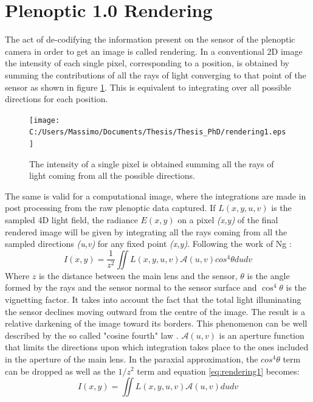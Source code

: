 \section{Plenoptic 1.0 Rendering}
\label{sec:rendering1}
The act of de-codifying the information present on the sensor of the plenoptic camera in order to get an image is called rendering. 
In a conventional 2D image the intensity of each single pixel, corresponding to a position, is obtained by summing the contributions of all the rays of light converging to that point of the sensor \cite{georgiev2010focused} as shown in figure \ref{fig:render1}. This is equivalent to integrating over all possible directions for each position. 
\begin{figure}[H]
	\centering
	\texttt{[image: C:/Users/Massimo/Documents/Thesis/Thesis\_PhD/rendering1.eps]}
	\caption{\label{fig:render1} The intensity of a single pixel is obtained summing all the rays of light coming from all the possible directions.\cite{ng2006digital} }
\end{figure}
The same is valid for a computational image, where the integrations are made in post processing from the raw plenoptic data captured.
 If $L(x,y,u,v)$ is the sampled 4D light field, the radiance $E(x,y)$ on a pixel \textit{(x,y)} of the final rendered image will be given by integrating all the rays coming from all the sampled directions \textit{(u,v)} for any fixed point\textit{ (x,y)}. Following the work of Ng \cite{ng2006digital}:
\begin{equation}
\label{eq:rendering1}
I(x,y)=\dfrac{1}{z^2}\iint L(x,y,u,v)\mathscr{A}(u,v)cos^4\theta dudv
\end{equation} 
Where $z$ is the distance between the main lens and the sensor, $\theta$ is the angle formed by the rays and the sensor normal to the sensor surface and $\cos^4\theta$ is the vignetting factor. It takes into account the fact that the total light illuminating the sensor  declines moving outward  from  the  centre  of  the  image. The result is a relative darkening of the image toward 
its borders. This phenomenon can be well described by the so called "cosine fourth" law \cite{kerr2007derivation}. $\mathscr{A}(u,v)$ is an aperture function that limits the directions upon which integration takes place to the ones included in the aperture of the main lens. In the paraxial approximation, the $cos^4\theta$ term can be dropped as well as the $1/z^2$ term and equation \ref{eq:rendering1} becomes:
\begin{equation}
\label{eq:rendering2}
I(x,y)=\iint L(x,y,u,v)\mathscr{A}(u,v) dudv
\end{equation}

